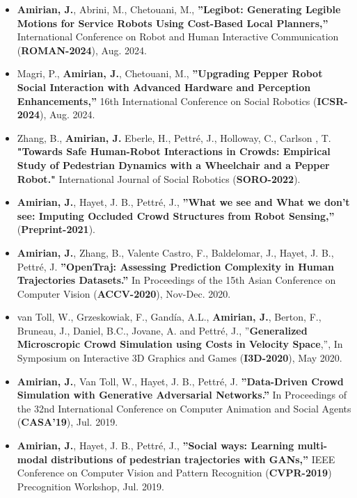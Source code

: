 \documentclass[10pt]{res}
\begin{document}
\begin{resume}
\begin{itemize}[leftmargin=*, itemsep=2pt]
\item {\bf Amirian, J.}, Abrini, M., Chetouani, M., {\bf ''Legibot: Generating Legible Motions for Service Robots Using Cost-Based Local Planners,''} International Conference on Robot and Human Interactive Communication (\textbf{ROMAN-2024}), Aug. 2024.

\item Magri, P., {\bf Amirian, J.}, Chetouani, M., {\bf ''Upgrading Pepper Robot Social Interaction with Advanced Hardware and Perception Enhancements,''} 16th International Conference on Social Robotics (\textbf{ICSR-2024}), Aug. 2024.

\item Zhang, B., \textbf{Amirian, J.} Eberle, H., Pettr\'e, J., Holloway, C., Carlson , T. \textbf{"Towards Safe Human-Robot Interactions in Crowds: Empirical Study of Pedestrian Dynamics with a Wheelchair and a Pepper Robot."} International Journal of Social Robotics (\textbf{SORO-2022}).
	
\item {\bf Amirian, J.}, Hayet, J. B., Pettré, J., {\bf ''What we see and What we don’t see: Imputing Occluded Crowd Structures from Robot Sensing,''} (\textbf{Preprint-2021}).

\item {\bf Amirian, J.}, Zhang, B., Valente Castro, F., Baldelomar, J., Hayet, J. B., Pettré, J. {\bf ''OpenTraj: Assessing Prediction Complexity in Human Trajectories Datasets.''} In Proceedings of the 15th Asian Conference on Computer Vision (\textbf{ACCV-2020}), Nov-Dec. 2020.

\item van Toll, W., Grzeskowiak, F., Gandía, A.L., \textbf{Amirian, J.}, Berton, F., Bruneau, J., Daniel, B.C., Jovane, A. and Pettré, J., ''\textbf{Generalized Microscropic Crowd Simulation using Costs in Velocity Space},'', In Symposium on Interactive 3D Graphics and Games (\textbf{I3D-2020}), May 2020.

\item {\bf Amirian, J.}, Van Toll, W., Hayet, J. B., Pettré, J. {\bf ''Data-Driven Crowd Simulation with Generative Adversarial Networks.''} In Proceedings of the 32nd International Conference on Computer Animation and Social Agents (\textbf{CASA'19}), Jul. 2019.

\item {\bf Amirian, J.}, Hayet, J. B., Pettré, J., {\bf ''Social ways: Learning multi-modal distributions of pedestrian trajectories with GANs,''} IEEE Conference on Computer Vision and Pattern Recognition (\textbf{CVPR-2019}) Precognition Workshop, Jul. 2019.


\end{itemize}
\end{resume}
\end{document}
